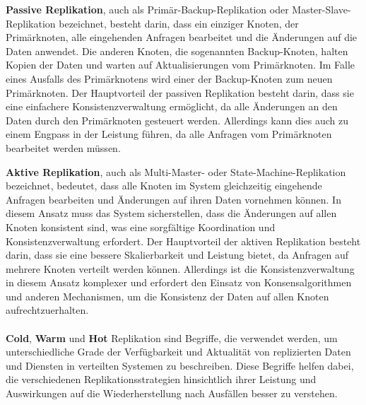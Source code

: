 \documentclass[../vs-script-first-v01.tex]{subfiles}
\begin{document}
\textbf{Passive Replikation}, auch als Primär-Backup-Replikation oder Master-Slave-Replikation bezeichnet, besteht darin, dass ein einziger Knoten, der Primärknoten, alle eingehenden Anfragen bearbeitet und die Änderungen auf die Daten anwendet. Die anderen Knoten, die sogenannten Backup-Knoten, halten Kopien der Daten und warten auf Aktualisierungen vom Primärknoten. Im Falle eines Ausfalls des Primärknotens wird einer der Backup-Knoten zum neuen Primärknoten. Der Hauptvorteil der passiven Replikation besteht darin, dass sie eine einfachere Konsistenzverwaltung ermöglicht, da alle Änderungen an den Daten durch den Primärknoten gesteuert werden. Allerdings kann dies auch zu einem Engpass in der Leistung führen, da alle Anfragen vom Primärknoten bearbeitet werden müssen.

\textbf{Aktive Replikation}, auch als Multi-Master- oder State-Machine-Replikation bezeichnet, bedeutet, dass alle Knoten im System gleichzeitig eingehende Anfragen bearbeiten und Änderungen auf ihren Daten vornehmen können. In diesem Ansatz muss das System sicherstellen, dass die Änderungen auf allen Knoten konsistent sind, was eine sorgfältige Koordination und Konsistenzverwaltung erfordert. Der Hauptvorteil der aktiven Replikation besteht darin, dass sie eine bessere Skalierbarkeit und Leistung bietet, da Anfragen auf mehrere Knoten verteilt werden können. Allerdings ist die Konsistenzverwaltung in diesem Ansatz komplexer und erfordert den Einsatz von Konsensalgorithmen und anderen Mechanismen, um die Konsistenz der Daten auf allen Knoten aufrechtzuerhalten.
\\\\
\textbf{Cold}, \textbf{Warm} und \textbf{Hot} Replikation sind Begriffe, die verwendet werden, um unterschiedliche Grade der Verfügbarkeit und Aktualität von replizierten Daten und Diensten in verteilten Systemen zu beschreiben. Diese Begriffe helfen dabei, die verschiedenen Replikationsstrategien hinsichtlich ihrer Leistung und Auswirkungen auf die Wiederherstellung nach Ausfällen besser zu verstehen.
\end{document}
